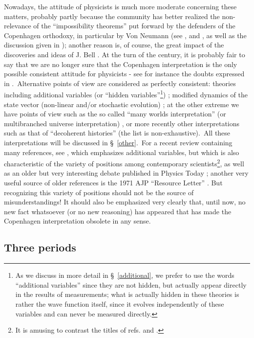 \documentclass[12pt,onecolumn]{article}%
\begin{document}
Nowadays, the attitude of physicists is much more moderate concerning these
matters, probably partly because the community has better realized the
non-relevance of the ``impossibility theorems'' put forward by the defenders
of the Copenhagen orthodoxy, in particular by Von Neumann \cite{Von-Neumann}
(see \cite{Bell-1}, \cite{Bohm-Bub-1} and \cite{Bohm-Bub-2}, as well as the
discussion given in \cite{Mermin}); another reason is, of course, the great
impact of the discoveries and ideas of J. Bell \cite{Bell-livre}. At the turn
of the century, it is probably fair to say that we are no longer sure that the
Copenhagen interpretation is the only possible consistent attitude for
physicists - see for instance the doubts expressed in \cite{Shimony}%
.\ Alternative points of view are considered as perfectly consistent: theories
including additional variables (or ``hidden variables''\footnote{As we discuss
in more detail in \S \ \ref{additional}, we prefer to use the words
``additional variables'' since they are not hidden, but actually appear
directly in the results of measurements; what is actually hidden in these
theories is rather the wave function itself, since it evolves independently of
these variables and can never be measured directly.\label{note-hidden}})
\cite{Bohm} \cite{Wiener-Siegel}; modified dynamics of the state vector
\cite{Bohm-Bub-1} \cite{Pearle} \cite{Pearle-2} \cite{Ghirardi} (non-linear
and/or stochastic evolution) ; at the other extreme we have points of view
such as the so called ``many worlds interpretation'' (or multibranched
universe interpretation) \cite{DeWitt}, or more recently other interpretations
such as that of ``decoherent histories'' \cite{Griffiths} (the list is
non-exhaustive).\ All these interpretations will be discussed in
\S \ \ref{other}.\ For a recent review containing many references, see
\cite{Goldstein}, which emphasizes additional variables, but which is also
characteristic of the variety of positions among contemporary
scientists\footnote{It is amusing to contrast the titles of refs.
\cite{Shimony} and \cite{Goldstein}.}, as well as an older but very
interesting debate published in Physics Today \cite{debate}; another very
useful source of older references is the 1971 AJP ``Resource Letter''
\cite{AJP-RL}. But recognizing this variety of positions should not be the
source of misunderstandings! It should also be emphasized very clearly that,
until now, no new fact whatsoever (or no new reasoning) has appeared that has
made the Copenhagen interpretation obsolete in any sense.

\subsection{Three periods}
\end{document}
